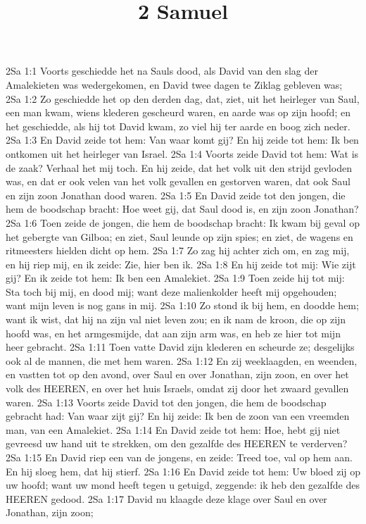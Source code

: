 

\title{2 Samuel}


2Sa 1:1  Voorts geschiedde het na Sauls dood, als David van den slag der Amalekieten was wedergekomen, en David twee dagen te Ziklag gebleven was;
2Sa 1:2  Zo geschiedde het op den derden dag, dat, ziet, uit het heirleger van Saul, een man kwam, wiens klederen gescheurd waren, en aarde was op zijn hoofd; en het geschiedde, als hij tot David kwam, zo viel hij ter aarde en boog zich neder.
2Sa 1:3  En David zeide tot hem: Van waar komt gij? En hij zeide tot hem: Ik ben ontkomen uit het heirleger van Israel.
2Sa 1:4  Voorts zeide David tot hem: Wat is de zaak? Verhaal het mij toch. En hij zeide, dat het volk uit den strijd gevloden was, en dat er ook velen van het volk gevallen en gestorven waren, dat ook Saul en zijn zoon Jonathan dood waren.
2Sa 1:5  En David zeide tot den jongen, die hem de boodschap bracht: Hoe weet gij, dat Saul dood is, en zijn zoon Jonathan?
2Sa 1:6  Toen zeide de jongen, die hem de boodschap bracht: Ik kwam bij geval op het gebergte van Gilboa; en ziet, Saul leunde op zijn spies; en ziet, de wagens en ritmeesters hielden dicht op hem.
2Sa 1:7  Zo zag hij achter zich om, en zag mij, en hij riep mij, en ik zeide: Zie, hier ben ik.
2Sa 1:8  En hij zeide tot mij: Wie zijt gij? En ik zeide tot hem: Ik ben een Amalekiet.
2Sa 1:9  Toen zeide hij tot mij: Sta toch bij mij, en dood mij; want deze malienkolder heeft mij opgehouden; want mijn leven is nog gans in mij.
2Sa 1:10  Zo stond ik bij hem, en doodde hem; want ik wist, dat hij na zijn val niet leven zou; en ik nam de kroon, die op zijn hoofd was, en het armgesmijde, dat aan zijn arm was, en heb ze hier tot mijn heer gebracht.
2Sa 1:11  Toen vatte David zijn klederen en scheurde ze; desgelijks ook al de mannen, die met hem waren.
2Sa 1:12  En zij weeklaagden, en weenden, en vastten tot op den avond, over Saul en over Jonathan, zijn zoon, en over het volk des HEEREN, en over het huis Israels, omdat zij door het zwaard gevallen waren.
2Sa 1:13  Voorts zeide David tot den jongen, die hem de boodschap gebracht had: Van waar zijt gij? En hij zeide: Ik ben de zoon van een vreemden man, van een Amalekiet.
2Sa 1:14  En David zeide tot hem: Hoe, hebt gij niet gevreesd uw hand uit te strekken, om den gezalfde des HEEREN te verderven?
2Sa 1:15  En David riep een van de jongens, en zeide: Treed toe, val op hem aan. En hij sloeg hem, dat hij stierf.
2Sa 1:16  En David zeide tot hem: Uw bloed zij op uw hoofd; want uw mond heeft tegen u getuigd, zeggende: ik heb den gezalfde des HEEREN gedood.
2Sa 1:17  David nu klaagde deze klage over Saul en over Jonathan, zijn zoon;
